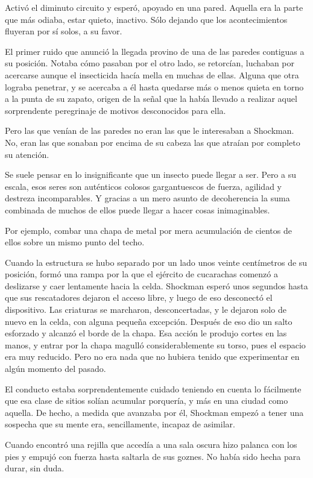Activó el diminuto circuito y esperó, apoyado en una pared. Aquella era la parte que más odiaba, estar quieto, inactivo. Sólo dejando que los acontecimientos fluyeran por sí solos, a su favor.

El primer ruido que anunció la llegada provino de una de las paredes contiguas a su posición. Notaba cómo pasaban por el otro lado, se retorcían, luchaban por acercarse aunque el insecticida hacía mella en muchas de ellas. Alguna que otra lograba penetrar, y se acercaba a él hasta quedarse más o menos quieta en torno a la punta de su zapato, origen de la señal que la había llevado a realizar aquel sorprendente peregrinaje de motivos desconocidos para ella.

Pero las que venían de las paredes no eran las que le interesaban a Shockman. No, eran las que sonaban por encima de su cabeza las que atraían por completo su atención.

Se suele pensar en lo insignificante que un insecto puede llegar a ser. Pero a su escala, esos seres son auténticos colosos gargantuescos de fuerza, agilidad y destreza incomparables. Y gracias a un mero asunto de decoherencia la suma combinada de muchos de ellos puede llegar a hacer cosas inimaginables.

Por ejemplo, combar una chapa de metal por mera acumulación de cientos de ellos sobre un mismo punto del techo.

Cuando la estructura se hubo separado por un lado unos veinte centímetros de su posición, formó una rampa por la que el ejército de cucarachas comenzó a deslizarse y caer lentamente hacia la celda. Shockman esperó unos segundos hasta que sus rescatadores dejaron el acceso libre, y luego de eso desconectó el dispositivo. Las criaturas se marcharon, desconcertadas, y le dejaron solo de nuevo en la celda, con alguna pequeña excepción. Después de eso dio un salto esforzado y alcanzó el borde de la chapa. Esa acción le produjo cortes en las manos, y entrar por la chapa magulló considerablemente su torso, pues el espacio era muy reducido. Pero no era nada que no hubiera tenido que experimentar en algún momento del pasado.

El conducto estaba sorprendentemente cuidado teniendo en cuenta lo fácilmente que esa clase de sitios solían acumular porquería, y más en una ciudad como aquella. De hecho, a medida que avanzaba por él, Shockman empezó a tener una sospecha que su mente era, sencillamente, incapaz de asimilar.

Cuando encontró una rejilla que accedía a una sala oscura hizo palanca con los pies y empujó con fuerza hasta saltarla de sus goznes. No había sido hecha para durar, sin duda.

